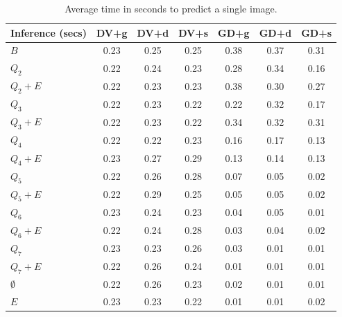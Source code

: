 \begin{table}[h]
  \centering
  \begin{tabular}{l|c|c|c|c|c|c}
    \hline
    \multicolumn{1}{c}{\bfseries Inference (secs)} & \multicolumn{1}{c}{\bfseries DV+g} &
    \multicolumn{1}{c}{\bfseries DV+d} & \multicolumn{1}{c}{\bfseries DV+s} &
    \multicolumn{1}{c}{\bfseries GD+g} & \multicolumn{1}{c}{\bfseries GD+d} &
    \multicolumn{1}{c}{\bfseries GD+s}\\
    \hline
    $B$         & 0.23 & 0.25 & 0.25 & 0.38 & 0.37 & 0.31 \\
    $Q_2$       & 0.22 & 0.24 & 0.23 & 0.28 & 0.34 & 0.16 \\
    $Q_2+E$     & 0.22 & 0.23 & 0.23 & 0.38 & 0.30 & 0.27 \\
    $Q_3$       & 0.22 & 0.23 & 0.22 & 0.22 & 0.32 & 0.17 \\
    $Q_3+E$     & 0.22 & 0.23 & 0.22 & 0.34 & 0.32 & 0.31 \\
    $Q_4$       & 0.22 & 0.22 & 0.23 & 0.16 & 0.17 & 0.13 \\
    $Q_4+E$     & 0.23 & 0.27 & 0.29 & 0.13 & 0.14 & 0.13 \\
    $Q_5$       & 0.22 & 0.26 & 0.28 & 0.07 & 0.05 & 0.02 \\
    $Q_5+E$     & 0.22 & 0.29 & 0.25 & 0.05 & 0.05 & 0.02 \\
    $Q_6$       & 0.23 & 0.24 & 0.23 & 0.04 & 0.05 & 0.01 \\
    $Q_6+E$     & 0.22 & 0.24 & 0.28 & 0.03 & 0.04 & 0.02 \\
    $Q_7$       & 0.23 & 0.23 & 0.26 & 0.03 & 0.01 & 0.01 \\
    $Q_7+E$     & 0.22 & 0.26 & 0.24 & 0.01 & 0.01 & 0.01 \\
    $\emptyset$ & 0.22 & 0.26 & 0.23 & 0.02 & 0.01 & 0.01 \\
    $E$         & 0.23 & 0.23 & 0.22 & 0.01 & 0.01 & 0.02 \\
  \end{tabular}
  \caption{Average time in seconds to predict a single image.\label{tab:time-inference}}
\end{table}
